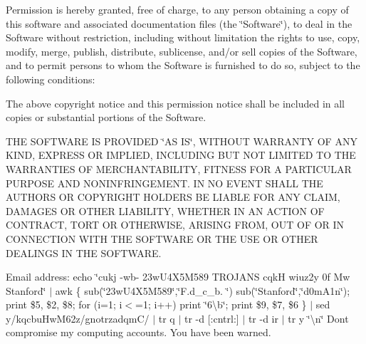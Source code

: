 Permission is hereby granted, free of charge, to any person obtaining a copy of this software and associated documentation files (the \char`\"{}\+Software\char`\"{}), to deal in the Software without restriction, including without limitation the rights to use, copy, modify, merge, publish, distribute, sublicense, and/or sell copies of the Software, and to permit persons to whom the Software is furnished to do so, subject to the following conditions\+:

The above copyright notice and this permission notice shall be included in all copies or substantial portions of the Software.

T\+H\+E S\+O\+F\+T\+W\+A\+R\+E I\+S P\+R\+O\+V\+I\+D\+E\+D \char`\"{}\+A\+S I\+S\char`\"{}, W\+I\+T\+H\+O\+U\+T W\+A\+R\+R\+A\+N\+T\+Y O\+F A\+N\+Y K\+I\+N\+D, E\+X\+P\+R\+E\+S\+S O\+R I\+M\+P\+L\+I\+E\+D, I\+N\+C\+L\+U\+D\+I\+N\+G B\+U\+T N\+O\+T L\+I\+M\+I\+T\+E\+D T\+O T\+H\+E W\+A\+R\+R\+A\+N\+T\+I\+E\+S O\+F M\+E\+R\+C\+H\+A\+N\+T\+A\+B\+I\+L\+I\+T\+Y, F\+I\+T\+N\+E\+S\+S F\+O\+R A P\+A\+R\+T\+I\+C\+U\+L\+A\+R P\+U\+R\+P\+O\+S\+E A\+N\+D N\+O\+N\+I\+N\+F\+R\+I\+N\+G\+E\+M\+E\+N\+T. I\+N N\+O E\+V\+E\+N\+T S\+H\+A\+L\+L T\+H\+E A\+U\+T\+H\+O\+R\+S O\+R C\+O\+P\+Y\+R\+I\+G\+H\+T H\+O\+L\+D\+E\+R\+S B\+E L\+I\+A\+B\+L\+E F\+O\+R A\+N\+Y C\+L\+A\+I\+M, D\+A\+M\+A\+G\+E\+S O\+R O\+T\+H\+E\+R L\+I\+A\+B\+I\+L\+I\+T\+Y, W\+H\+E\+T\+H\+E\+R I\+N A\+N A\+C\+T\+I\+O\+N O\+F C\+O\+N\+T\+R\+A\+C\+T, T\+O\+R\+T O\+R O\+T\+H\+E\+R\+W\+I\+S\+E, A\+R\+I\+S\+I\+N\+G F\+R\+O\+M, O\+U\+T O\+F O\+R I\+N C\+O\+N\+N\+E\+C\+T\+I\+O\+N W\+I\+T\+H T\+H\+E S\+O\+F\+T\+W\+A\+R\+E O\+R T\+H\+E U\+S\+E O\+R O\+T\+H\+E\+R D\+E\+A\+L\+I\+N\+G\+S I\+N T\+H\+E S\+O\+F\+T\+W\+A\+R\+E.

Email address\+: echo \char`\"{}cukj -\/wb-\/ 23w\+U4\+X5\+M589 T\+R\+O\+J\+A\+N\+S cqk\+H wiuz2y 0f Mw Stanford\char`\"{} $\vert$ awk \textquotesingle{}\{ sub(\char`\"{}23w\+U4\+X5\+M589\char`\"{},\char`\"{}\+F.\+d\+\_\+c\+\_\+b. \char`\"{}) sub(\char`\"{}\+Stanford\char`\"{},\char`\"{}d0m\+A1n\char`\"{}); print \$5, \$2, \$8; for (i=1; i$<$=1; i++) print \char`\"{}6\textbackslash{}b\char`\"{}; print \$9, \$7, \$6 \}\textquotesingle{} $\vert$ sed y/kqcbu\+Hw\+M62z/gnotrzadqm\+C/ $\vert$ tr \textquotesingle{}q\textquotesingle{} \textquotesingle{} \textquotesingle{} $\vert$ tr -\/d \mbox{[}\+:cntrl\+:\mbox{]} $\vert$ tr -\/d \textquotesingle{}ir\textquotesingle{} $\vert$ tr y \char`\"{}\textbackslash{}n\char`\"{} Don\textquotesingle{}t compromise my computing accounts. You have been warned. 